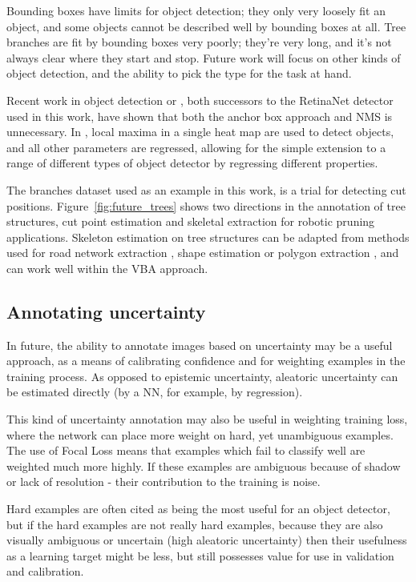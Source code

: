 Bounding boxes have limits for object detection; they only very loosely fit an object, and some objects cannot be described well by bounding boxes at all. Tree branches are fit by bounding boxes very poorly; they're very long, and it's not always clear where they start and stop. Future work will focus on other kinds of object detection, and the ability to pick the type for the task at hand.

Recent work in object detection \cite{Zhou2019} or \cite{Law2018}, both successors to the RetinaNet detector \cite{Wang2017} used in this work, have shown that both the anchor box approach and \gls{NMS} is unnecessary. In \cite{Zhou2019}, local maxima in a single heat map are used to detect objects, and all other parameters are regressed, allowing for the simple extension to a range of different types of object detector by regressing different properties.

The branches dataset used as an example in this work, is a trial for detecting cut positions. Figure~\ref{fig:future_trees} shows two directions in the annotation of tree structures, cut point estimation and skeletal extraction for robotic pruning applications. Skeleton estimation on tree structures can be adapted from methods used for road network extraction \cite{Li2018}, shape estimation \cite{Jiang2019a} or polygon extraction \cite{Acuna2018}, and can work well within the \gls{VBA} approach.

\subsection{Annotating uncertainty}

In future, the ability to annotate images based on uncertainty may be a useful approach, as a means of calibrating confidence and for weighting examples in the training process. As opposed to epistemic uncertainty, aleatoric uncertainty can be estimated directly (by a \gls{NN}, for example, by regression).  

This kind of uncertainty annotation may also be useful in weighting training loss, where the network can place more weight on hard, yet unambiguous examples. The use of Focal Loss means that examples which fail to classify well are weighted much more highly. If these examples are ambiguous because of shadow or lack of resolution - their contribution to the training is noise.

Hard examples are often cited as being the most useful for an object detector, but if the hard examples are not really hard examples, because they are also visually ambiguous or uncertain (high aleatoric uncertainty) then their usefulness as a learning target might be less, but still possesses value for use in validation and calibration.




